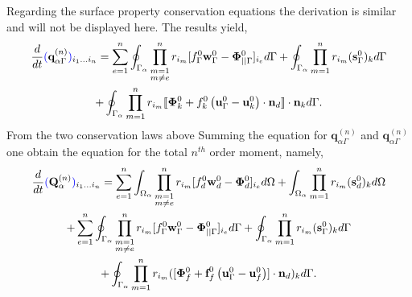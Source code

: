 \documentclass[11pt]{My_preprint}
\providecommand{\DIFadd}[1]{{\protect\color{blue}\uwave{#1}}} %
\providecommand{\DIFaddbegin}{} %
\providecommand{\DIFaddend}{} %
\providecommand{\DIFdelbegin}{} %
\providecommand{\DIFdelend}{} %
\begin{document}
Regarding the surface property conservation equations the derivation is similar and will not be displayed here. 
The results yield, 
\begin{multline}
    \ddt {\DIFdelbegin %
\DIFdelend \DIFaddbegin \DIFadd{(}\DIFaddend \textbf{q}_{\alpha\Gamma}^{(n)}\DIFdelbegin %
\DIFdelend \DIFaddbegin \DIFadd{)}\DIFaddend _{i_1\ldots i_n}}
    = \sum_{e=1}^{n} 
    \intS{
        \prod^{n}_{\substack{ m=1 \\m \neq e}} r_{i_m} [f_\Gamma^0\textbf{w}_\Gamma^0 - \bm\Phi_{||\Gamma}^0]_{i_e}
    }
    + \intS{ \pri{1}{n} (\textbf{s}_\Gamma^0)_k }
    \\
    +\intS{ \pri{1}{n} \Jump{\bm\Phi_k^0 + f_k^0 \left(\textbf{u}_\Gamma^0 - \textbf{u}_k^0\right)\cdot \textbf{n}_d}}.
    \label{eq:dt_Qgamma_n}
\end{multline}
From the two conservation laws above 
Summing the equation for $\textbf{q}_{\alpha\Gamma}^{(n)}$ and $\textbf{q}_{\alpha\Gamma}^{(n)}$ one obtain the equation for the total $n^{th}$ order moment,  namely, 
\begin{multline}
    \ddt {\DIFdelbegin %
\DIFdelend \DIFaddbegin \DIFadd{(}\DIFaddend \textbf{Q}_{\alpha}^{(n)}\DIFdelbegin %
\DIFdelend \DIFaddbegin \DIFadd{)}\DIFaddend _{i_1\ldots i_n}}
    = 
    \sum_{e=1}^{n} 
    \intO{
        \prod^{n}_{\substack{ m=1 \\m \neq e}} r_{i_m} [f_d^0\textbf{w}_d^0  - \bm\Phi_d^0]_{i_e}
    }
    + \intO{ \pri{1}{n} (\textbf{s}_d^0)_k }\\
    +     
    \sum_{e=1}^{n} 
    \intS{
        \prod^{n}_{\substack{ m=1 \\m \neq e}} r_{i_m} [f_\Gamma^0\textbf{w}_\Gamma^0 - \bm\Phi_{||\Gamma}^0]_{i_e}
    }
    + \intS{ \pri{1}{n} (\textbf{s}_\Gamma^0)_k }
    \\
    +\intS{ \pri{1}{n} ([\bm\Phi_f^0 + \textbf{f}_f^0 \left(\textbf{u}_\Gamma^0 - \textbf{u}_f^0\right)]\cdot \textbf{n}_d)_k }. 
    \label{eq:dt_Q_n}
\end{multline}
\end{document}
